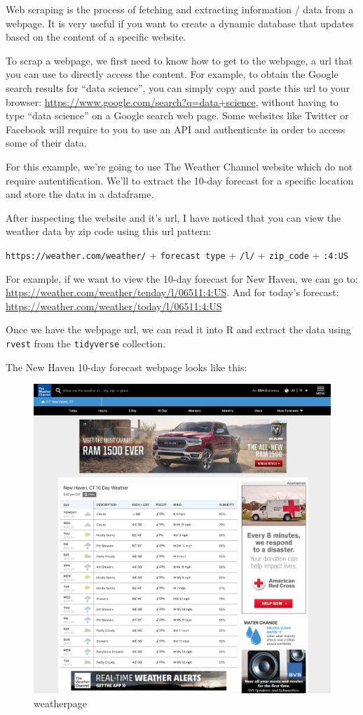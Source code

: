\documentclass[
]{book}
\begin{document}
Web scraping is the process of fetching and extracting information / data from a webpage. It is very useful if you want to create a dynamic database that updates based on the content of a specific website.

To scrap a webpage, we first need to know how to get to the webpage, a url that you can use to directly access the content. For example, to obtain the Google search results for ``data science'', you can simply copy and paste this url to your browser: \url{https://www.google.com/search?q=data+science}, without having to type ``data science'' on a Google search web page. Some websites like Twitter or Facebook will require to you to use an API and authenticate in order to access some of their data.

For this example, we're going to use The Weather Channel website which do not require autentification. We'll to extract the 10-day forecast for a specific location and store the data in a dataframe.

After inspecting the website and it's url, I have noticed that you can view the weather data by zip code using this url pattern:

\texttt{https://weather.com/weather/} + \texttt{forecast\ type} + \texttt{/l/} + \texttt{zip\_code} + \texttt{:4:US}

For example, if we want to view the 10-day forecast for New Haven, we can go to: \url{https://weather.com/weather/tenday/l/06511:4:US}. And for today's forecast: \url{https://weather.com/weather/today/l/06511:4:US}

Once we have the webpage url, we can read it into R and extract the data using \texttt{rvest} from the \texttt{tidyverse} collection.

The New Haven 10-day forecast webpage looks like this:

\begin{figure}
\centering
\includegraphics{images/weatherpage.png}
\caption{weatherpage}
\end{figure}
\end{document}
